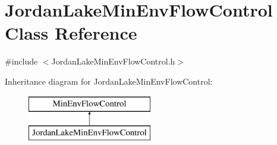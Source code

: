 \hypertarget{classJordanLakeMinEnvFlowControl}{}\section{Jordan\+Lake\+Min\+Env\+Flow\+Control Class Reference}
\label{classJordanLakeMinEnvFlowControl}


{\ttfamily \#include $<$Jordan\+Lake\+Min\+Env\+Flow\+Control.\+h$>$}

Inheritance diagram for Jordan\+Lake\+Min\+Env\+Flow\+Control\+:\begin{figure}[H]
\begin{center}
\leavevmode
\includegraphics[height=2.000000cm]{classJordanLakeMinEnvFlowControl}
\end{center}
\end{figure}

